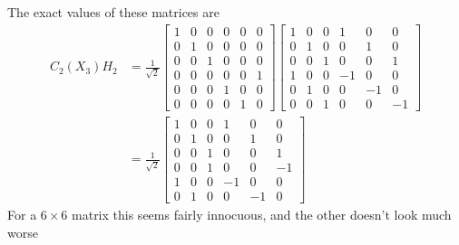 The exact values of these matrices are
\begin{align*}
	C_2(X_3)H_2 &=
	\frac{1}{\sqrt{2}}
	\begin{bmatrix}
		1&0&0&0&0&0\\
		0&1&0&0&0&0\\ 
		0&0&1&0&0&0\\ 
		0&0&0&0&0&1\\ 
		0&0&0&1&0&0\\ 
		0&0&0&0&1&0
	\end{bmatrix}
	\begin{bmatrix}
		1&0&0&1&0&0\\ 
		0&1&0&0&1&0\\ 
		0&0&1&0&0&1\\ 
		1&0&0&-1&0&0\\ 
		0&1&0&0&-1&0\\ 
		0&0&1&0&0&-1
	\end{bmatrix}
	\\&=
	\frac{1}{\sqrt{2}}
	\begin{bmatrix}
		1&0&0&1&0&0\\ 
		0&1&0&0&1&0\\ 
		0&0&1&0&0&1\\ 
		0&0&1&0&0&-1\\ 
		1&0&0&-1&0&0\\ 
		0&1&0&0&-1&0
	\end{bmatrix}
\end{align*}
For a $6\times6$ matrix this seems fairly innocuous, and the other doesn't look much worse
